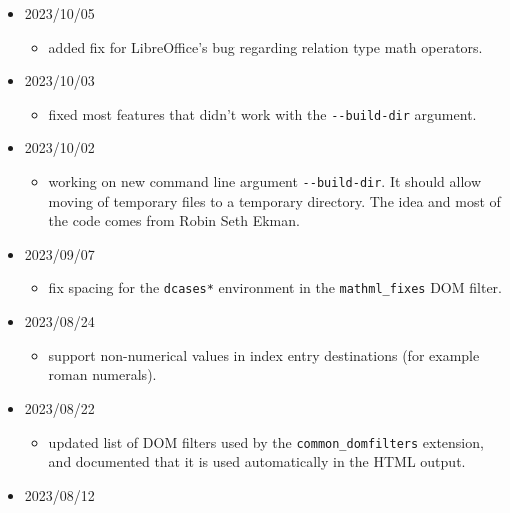 \begin{itemize}
  \begin{itemize}
  \tightlist
  \item
    print info about packages with no corresponding \texttt{.4ht} file.
  \end{itemize}
\item
  2023/10/05

  \begin{itemize}
  \tightlist
  \item
    added fix for LibreOffice's bug regarding relation type math
    operators.
  \end{itemize}
\item
  2023/10/03

  \begin{itemize}
  \tightlist
  \item
    fixed most features that didn't work with the \texttt{-\/-build-dir}
    argument.
  \end{itemize}
\item
  2023/10/02

  \begin{itemize}
  \tightlist
  \item
    working on new command line argument \texttt{-\/-build-dir}. It
    should allow moving of temporary files to a temporary directory. The
    idea and most of the code comes from Robin Seth Ekman.
  \end{itemize}
\item
  2023/09/07

  \begin{itemize}
  \tightlist
  \item
    fix spacing for the \texttt{dcases*} environment in the
    \texttt{mathml\_fixes} DOM filter.
  \end{itemize}
\item
  2023/08/24

  \begin{itemize}
  \tightlist
  \item
    support non-numerical values in index entry destinations (for
    example roman numerals).
  \end{itemize}
\item
  2023/08/22

  \begin{itemize}
  \tightlist
  \item
    updated list of DOM filters used by the \texttt{common\_domfilters}
    extension, and documented that it is used automatically in the HTML
    output.
  \end{itemize}
\item
  2023/08/12


\end{itemize}
